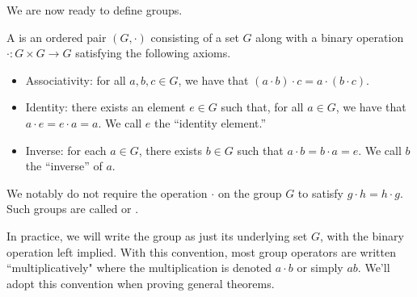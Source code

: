 \documentclass[../notes.tex]{subfiles}
\begin{document}
We are now ready to define groups.
\begin{definition} \label{defi:group}
    A  is an ordered pair $(G,\cdot)$ consisting of a set $G$ along with a binary operation $\cdot\colon G \times G \to G$ satisfying the following axioms.
    \begin{itemize}
        \item Associativity: for all $a,b,c \in G$, we have that $(a \cdot b) \cdot c = a \cdot (b \cdot c)$.
        \item Identity: there exists an element $e \in G$ such that, for all $a \in G$, we have that $a \cdot e = e \cdot a = a$. We call $e$ the ``identity element.''
        \item Inverse: for each $a \in G$, there exists $b\in G$ such that $a \cdot b=b \cdot a = e$. We call $b$ the ``inverse'' of $a$.
    \end{itemize}
    We notably do not require the operation $\cdot$ on the group $G$ to satisfy $g\cdot h=h\cdot g$. Such groups are called  or .
\end{definition}
In practice, we will write the group as just its underlying set $G$, with the binary operation left implied. With this convention, most group operators are written ``multiplicatively" where the multiplication is denoted $a \cdot b$ or simply $ab$. We'll adopt this convention when proving general theorems.
\end{document}
